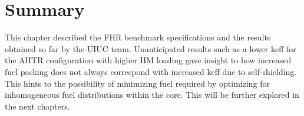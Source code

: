 \section{Summary}

This chapter described the \gls{FHR} benchmark specifications and the results 
obtained so far by the UIUC team. 
Unanticipated results such as a lower keff for the \gls{AHTR} configuration with 
higher \gls{HM} loading gave insight to how increased fuel packing does not always 
correspond with increased keff due to self-shielding.
This hints to the possibility of minimizing fuel required by optimizing for 
inhomogeneous fuel distributions within the core. 
This will be further explored in the next chapters. 

